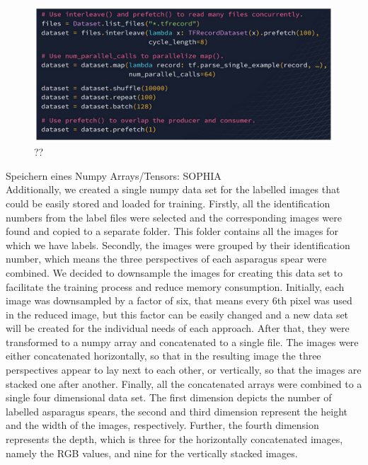 \begin{figure}[h]
	\centering
	\includegraphics[scale=0.6]{Figures/chapter03/dataset_code}
	\decoRule
	\caption[??]{??}
	\label{fig:DatasetCode}
\end{figure}

Speichern eines Numpy Arrays/Tensors: SOPHIA \\
Additionally, we created a single numpy data set for the labelled images that could be easily stored and loaded for training. Firstly, all the identification numbers from the label files were selected and the corresponding images were found and copied to a separate folder. This folder contains all the images for which we have labels. Secondly, the images were grouped by their identification number, which means the three perspectives of each asparagus spear were combined. We decided to downsample the images for creating this data set to facilitate the training process and reduce memory consumption. Initially, each image was downsampled by a factor of six, that means every 6th pixel was used in the reduced image, but this factor can be easily changed and a new data set will be created for the individual needs of each approach. After that, they were transformed to a numpy array and concatenated to a single file. The images were either concatenated horizontally, so that in the resulting image the three perspectives appear to lay next to each other, or vertically, so that the images are stacked one after another. Finally, all the concatenated arrays were combined to a single four dimensional data set. The first dimension depicts the number of labelled asparagus spears, the second and third dimension represent the height and the width of the images, respectively.  Further, the fourth dimension represents the depth, which is three for the horizontally concatenated images, namely the RGB values, and nine for the vertically stacked images. \\
\\
